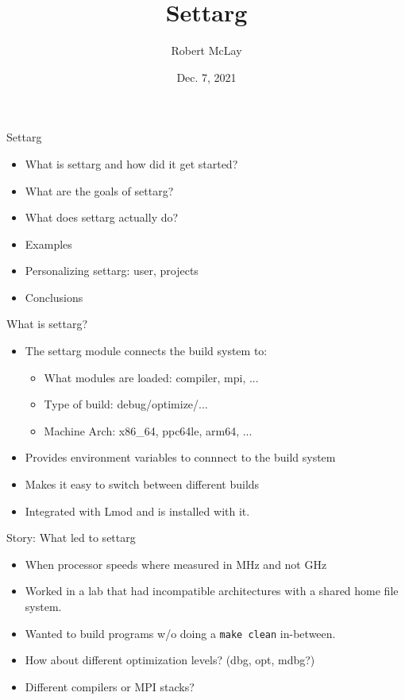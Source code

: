 \documentclass{beamer}
\begin{document}
\title[Lmod]{Settarg}
\author{Robert McLay} 
\date{Dec. 7, 2021}

\frame{\titlepage} 

\begin{frame}{Settarg}
  \begin{itemize}
    \item What is settarg and how did it get started?
    \item What are the goals of settarg?
    \item What does settarg actually do?
    \item Examples
    \item Personalizing settarg: user, projects
    \item Conclusions
  \end{itemize}
\end{frame}

\begin{frame}{What is settarg?}
  \begin{itemize}
    \item The settarg module connects the build system to:
      \begin{itemize}
        \item What modules are loaded: compiler, mpi, ...
        \item Type of build: debug/optimize/...
        \item Machine Arch: x86\_64, ppc64le, arm64, ...
      \end{itemize}
    \item Provides environment variables to connnect to the build system
    \item Makes it easy to switch between different builds
    \item Integrated with Lmod and is installed with it.
  \end{itemize}
\end{frame}

\begin{frame}{Story: What led to settarg}
  \begin{itemize}
    \item When processor speeds where measured in MHz and not GHz
    \item Worked in a lab that had incompatible architectures with a
      shared home file system.
    \item Wanted to build programs w/o doing a {\color{blue}\texttt{make
          clean}} in-between.
    \item How about different optimization levels? (dbg, opt, mdbg?)
    \item Different compilers or MPI stacks?
  \end{itemize}
\end{frame}
\end{document}
